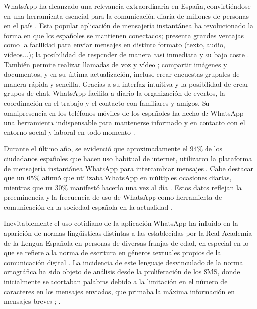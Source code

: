 \documentclass[spanish]{textolivre}
\begin{document}
WhatsApp ha alcanzado una relevancia extraordinaria en España, convirtiéndose en una herramienta esencial para la comunicación diaria de millones de personas en el país \cite[p. 101]{vazquez-cano_alisis_2015}. Esta popular aplicación de mensajería instantánea ha revolucionado la forma en que los españoles se mantienen conectados; presenta grandes ventajas como la facilidad para enviar mensajes en distinto formato (texto, audio, vídeos...); la posibilidad de responder de manera casi inmediata y su bajo coste \cite{suarez_lantaron_whatsapp:_2018}. También permite realizar llamadas de voz y vídeo \cite{scribano_miradas_nodate}; compartir imágenes y documentos, y en su última actualización, incluso crear encuestas grupales de manera rápida y sencilla. Gracias a su interfaz intuitiva y la posibilidad de crear grupos de chat, WhatsApp facilita a diario la organización de eventos, la coordinación en el trabajo y el contacto con familiares y amigos. Su omnipresencia en los teléfonos móviles de los españoles ha hecho de WhatsApp una herramienta indispensable para mantenerse informado y en contacto con el entorno social y laboral en todo momento \cite{fondevila-gascon_usos_2019}.

Durante el último año, se evidenció que aproximadamente el 94\% de los ciudadanos españoles que hacen uso habitual de internet, utilizaron la plataforma de mensajería instantánea WhatsApp para intercambiar mensajes \cite{comision_nacional_de_los_mercados_y_la_competencia_ocho_nodate}. Cabe destacar que un 65\% afirmó que utilizaba WhatsApp en múltiples ocasiones diarias, mientras que un 30\% manifestó hacerlo una vez al día \cite{statista_distribucion_nodate}. Estos datos reflejan la preeminencia y la frecuencia de uso de WhatsApp como herramienta de comunicación en la sociedad española en la actualidad \cite{molina_garcia_hablamos?_2020}. 

Inevitablemente el uso cotidiano de la aplicación WhatsApp ha influido en la aparición de normas lingüísticas distintas a las establecidas por la Real Academia de la Lengua Española en personas de diversas franjas de edad, en especial en lo que se refiere a la norma de escritura en géneros textuales propios de la comunicación digital \cite{gomez_camacho_norma_2017}. La incidencia de este lenguaje desvinculado de la norma ortográfica ha sido objeto de análisis desde la proliferación de los SMS, donde inicialmente se acortaban palabras debido a la limitación en el número de caracteres en los mensajes enviados, que primaba la máxima información en mensajes breves \cite[p. 358]{forbes_textisms:_2019}; \cite[p. 3]{jacquet_contextual_2021}.
\end{document}
